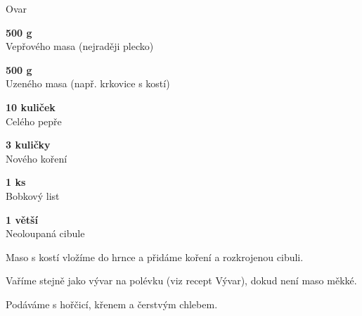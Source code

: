 \documentclass[11pt,a4paper]{article}
\begin{document}
\begin{recipe}[Peru]{Ovar}
    \begin{ingredients}
        \item \parbox[t]{\linewidth}{\raggedright \weight \textbf{500 g}\\ Vepřového masa (nejraději plecko)}
        \item \parbox[t]{\linewidth}{\raggedright \weight \textbf{500 g}\\ Uzeného masa (např. krkovice s kostí)}
        \item \parbox[t]{\linewidth}{\raggedright \piece \textbf{10 kuliček}\\ Celého pepře}
        \item \parbox[t]{\linewidth}{\raggedright \piece \textbf{3 kuličky}\\ Nového koření}
        \item \parbox[t]{\linewidth}{\raggedright \piece \textbf{1 ks}\\ Bobkový list}
        \item \parbox[t]{\linewidth}{\raggedright \piece \textbf{1 větší}\\ Neoloupaná cibule}
    \end{ingredients}
    \begin{steps}
        \item Maso s kostí vložíme do hrnce a přidáme koření a rozkrojenou cibuli.
        \item Vaříme stejně jako vývar na polévku (viz recept Vývar), dokud není maso měkké.
        \item Podáváme s hořčicí, křenem a čerstvým chlebem.
    \end{steps}
\end{recipe}
\end{document}
